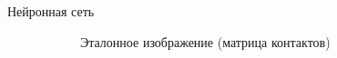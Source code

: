 \documentclass{beamer}
\begin{document}
\begin{frame}{Нейронная сеть}
\begin{figure}[h]
\begin{subfigure}{.33\textwidth}
\begin{overprint}
          \end{overprint}
          \caption{Эталонное изображение (матрица контактов)}
    \end{subfigure}%
    \begin{subfigure}{.33\textwidth}
          \centering
          \begin{overprint}

\end{overprint}
\end{subfigure}
\end{figure}
\end{frame}
\end{document}
